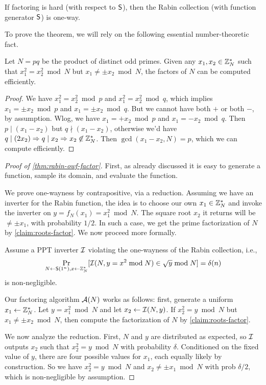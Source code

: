 \documentclass[11pt]{article}
\begin{document}
\begin{theorem}
  \label{thm:rabin-owf-factor}
  If factoring is hard (with respect to $\mathsf{S}$), then the Rabin
  collection (with function generator $\mathsf{S}$) is one-way.
\end{theorem}

To prove the theorem, we will rely on the following essential number-theoretic fact.

\begin{claim}
  \label{claim:roots-factor}
  Let $N = pq$ be the product of distinct odd primes.
  Given any $x_{1}, x_{2} \in \mathbb{Z}_N^{*}$ such that $x_{1}^{2} = x_{2}^{2} \bmod N$ but $x_{1} \neq \pm x_{2} \bmod N$, the factors of $N$ can be computed efficiently.
\end{claim}

\begin{proof}
  We have $x_{1}^{2} = x_{2}^{2} \bmod p$ and $x_{1}^{2} = x_{2}^{2}
  \bmod q$, which implies $x_{1} = \pm x_{2} \bmod p$ and $x_{1} =
  \pm x_{2} \bmod q$.  But we cannot have both $+$ or both $-$, by
  assumption.  Wlog, we have $x_{1} = + x_{2} \bmod p$ and $x_{1} =
  - x_{2} \bmod q$.  Then $p \mid (x_{1}-x_{2})$ but $q \nmid
  (x_{1}-x_{2})$, otherwise we'd have $q \mid (2x_{2}) \Rightarrow q
  \mid x_{2} \Rightarrow x_{2} \not\in \mathbb{Z}_N^{*}$.  Then
  $\gcd(x_{1}-x_{2},N) = p$, which we can compute efficiently.
\end{proof}

\begin{proof}[Proof of \cref{thm:rabin-owf-factor}]
  First, as already discussed it is easy to generate a function,
  sample its domain, and evaluate the function.

  We prove one-wayness by contrapositive, via a reduction.
  Assuming we have an inverter for the Rabin function, the idea is to choose our own $x_{1} \in \mathbb{Z}_N^{*}$ and invoke the inverter on $y = f_{N}(x_{1}) = x_{1}^{2} \bmod N$.
  The square root $x_{2}$ it returns will be $\neq \pm x_{1}$, with probability $1/2$.
  In such a case, we get the prime factorization of $N$ by \cref{claim:roots-factor}.
  We now proceed more formally.

  Assume a PPT inverter $\mathcal{I}$ violating the one-wayness
  of the Rabin collection, i.e., \[ \Pr_{N \gets \mathsf{S}(1^{n}), x
    \gets \mathbb{Z}_N^{*}}[\mathcal{I}(N, y = x^{2} \bmod N) \in \sqrt{y} \bmod N] =
  \delta(n) \] is non-negligible.

  Our factoring algorithm $\mathcal{A}(N)$ works as follows: first, generate
  a uniform $x_{1} \gets \mathbb{Z}_N^{*}$.  Let $y = x_{1}^{2} \bmod N$ and
  let $x_{2} \gets \mathcal{I}(N, y)$.  If $x_{2}^{2} = y \bmod N$ but $x_{1}
  \neq \pm x_{2} \bmod N$, then compute the factorization of $N$ by
  \cref{claim:roots-factor}.

  We now analyze the reduction.  First, $N$ and $y$ are distributed as
  expected, so $\mathcal{I}$ outputs $x_{2}$ such that $x_{2}^{2} = y \bmod
  N$ with probability $\delta$.  Conditioned on the fixed value of
  $y$, there are four possible values for $x_{1}$, each equally likely
  by construction.  So we have $x_{2}^{2} = y \bmod N$ and $x_{2} \neq
  \pm x_{1} \bmod N$ with prob $\delta/2$, which is non-negligible by
  assumption.
\end{proof}
\end{document}
